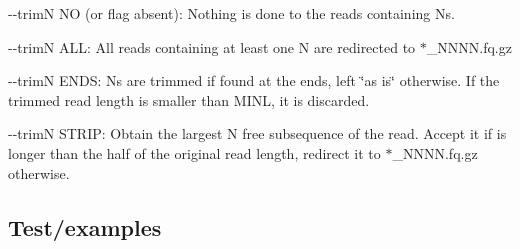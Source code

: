 \begin{DoxyItemize}
\item {\ttfamily -\/-\/trimN NO} (or flag absent)\+: Nothing is done to the reads containing N\textquotesingle{}s.
\item {\ttfamily -\/-\/trimN A\+LL}\+: All reads containing at least one N are redirected to {\ttfamily $\ast$\+\_\+\+N\+N\+NN.fq.\+gz}
\item {\ttfamily -\/-\/trimN E\+N\+DS}\+: N\textquotesingle{}s are trimmed if found at the ends, left \char`\"{}as is\char`\"{} otherwise. If the trimmed read length is smaller than M\+I\+NL, it is discarded.
\item {\ttfamily -\/-\/trimN S\+T\+R\+IP}\+: Obtain the largest N free subsequence of the read. Accept it if is longer than the half of the original read length, redirect it to {\ttfamily $\ast$\+\_\+\+N\+N\+NN.fq.\+gz} otherwise.
\end{DoxyItemize}

\subsection*{Test/examples}

